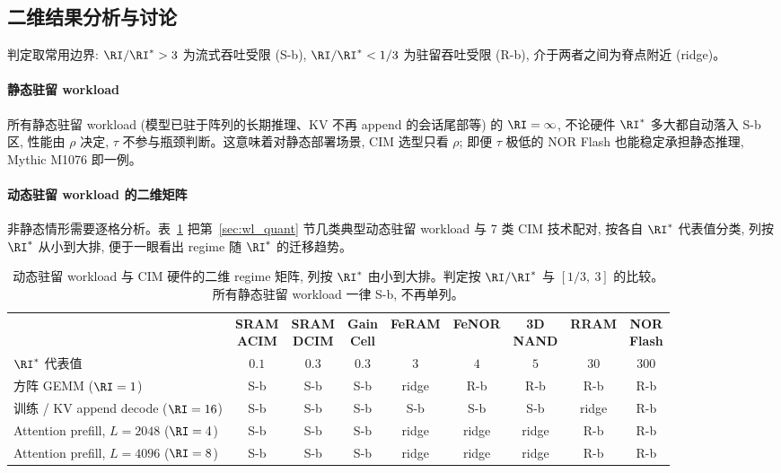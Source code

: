 \subsection{二维结果分析与讨论}
\label{sec:matrix_eval}

判定取常用边界: $\RI/\RI^{*} > 3$ 为流式吞吐受限 (S-b), $\RI/\RI^{*} < 1/3$ 为驻留吞吐受限 (R-b), 介于两者之间为脊点附近 (ridge)。

\paragraph{静态驻留 workload}
所有静态驻留 workload (模型已驻于阵列的长期推理、KV 不再 append 的会话尾部等) 的 $\RI = \infty$, 不论硬件 $\RI^{*}$ 多大都自动落入 S-b 区, 性能由 $\rho$ 决定, $\tau$ 不参与瓶颈判断。这意味着对静态部署场景, CIM 选型只看 $\rho$; 即便 $\tau$ 极低的 NOR Flash 也能稳定承担静态推理, Mythic M1076 即一例。

\paragraph{动态驻留 workload 的二维矩阵}
非静态情形需要逐格分析。表~\ref{tab:regime_matrix} 把第~\ref{sec:wl_quant} 节几类典型动态驻留 workload 与 7 类 CIM 技术配对, 按各自 $\RI^{*}$ 代表值分类, 列按 $\RI^{*}$ 从小到大排, 便于一眼看出 regime 随 $\RI^{*}$ 的迁移趋势。

\begin{table}[H]
\centering
\small
\renewcommand{\arraystretch}{1.3}
\setlength{\tabcolsep}{4pt}
\begin{tabular}{@{} p{} c c c c c c c c @{}}
\toprule
& \makecell{\textbf{SRAM} \\ \textbf{ACIM}} & \makecell{\textbf{SRAM} \\ \textbf{DCIM}} & \makecell{\textbf{Gain} \\ \textbf{Cell}} & \textbf{FeRAM} & \textbf{FeNOR} & \makecell{\textbf{3D} \\ \textbf{NAND}} & \textbf{RRAM} & \makecell{\textbf{NOR} \\ \textbf{Flash}} \\
$\RI^{*}$ 代表值 & $0.1$ & $0.3$ & $0.3$ & $3$ & $4$ & $5$ & $30$ & $300$ \\
\midrule
方阵 GEMM ($\RI = 1$)               & S-b & S-b & S-b & ridge & R-b   & R-b   & R-b & R-b \\
训练 / KV append decode ($\RI = 16$) & S-b & S-b & S-b & S-b   & S-b   & S-b   & ridge & R-b \\
Attention prefill, $L = 2048$ ($\RI = 4$) & S-b & S-b & S-b & ridge & ridge & ridge & R-b & R-b \\
Attention prefill, $L = 4096$ ($\RI = 8$) & S-b & S-b & S-b & ridge & ridge & ridge & R-b & R-b \\
\bottomrule
\end{tabular}
\caption{动态驻留 workload 与 CIM 硬件的二维 regime 矩阵, 列按 $\RI^{*}$ 由小到大排。判定按 $\RI/\RI^{*}$ 与 $[1/3,\ 3]$ 的比较。所有静态驻留 workload 一律 S-b, 不再单列。}
\label{tab:regime_matrix}
\end{table}

